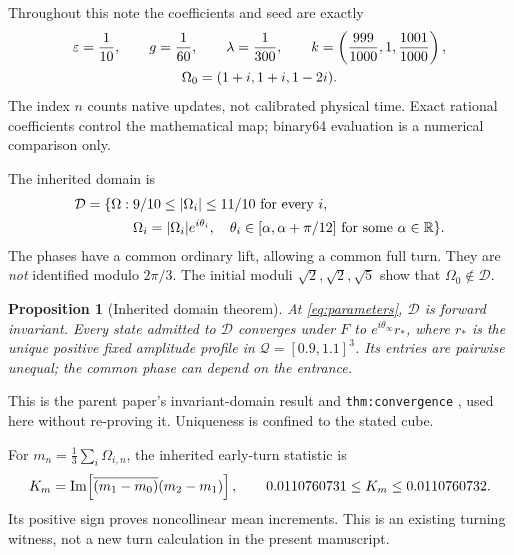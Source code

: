 \documentclass[11pt,a4paper]{article}
\numberwithin{equation}{section}
\newtheorem{proposition}[theorem]{Proposition}
\theoremstyle{remark}\newtheorem{remark}[theorem]{Remark}
\newcommand{\D}{\mathcal D}\newcommand{\Q}{\mathcal Q}
\begin{document}
Throughout this note the coefficients and seed are exactly
\begin{gather}
\varepsilon=\frac1{10},\qquad g=\frac1{60},\qquad\lambda=\frac1{300},\qquad
k=\left(\frac{999}{1000},1,\frac{1001}{1000}\right),\label{eq:parameters}\\
\Omega_0=(1+i,1+i,1-2i).\label{eq:seed}
\end{gather}
The index $n$ counts native updates, not calibrated physical time. Exact rational coefficients control the mathematical map; binary64 evaluation is a numerical comparison only.

The inherited domain is
\begin{equation}
\begin{split}
\D=\{\Omega:\;&9/10\le|\Omega_i|\le11/10\ \text{for every }i,\\
&\Omega_i=|\Omega_i|e^{i\theta_i},\quad
\theta_i\in[\alpha,\alpha+\pi/12]\ \text{for some }\alpha\in\R\}.
\end{split}\label{eq:domain}
\end{equation}
The phases have a common ordinary lift, allowing a common full turn. They are \emph{not} identified modulo $2\pi/3$. The initial moduli $\sqrt2,\sqrt2,\sqrt5$ show that $\Omega_0\notin\D$.

\begin{proposition}[Inherited domain theorem]\label{prop:inherited}
At \eqref{eq:parameters}, $\D$ is forward invariant. Every state admitted to $\D$ converges under $F$ to $e^{i\theta_\infty}r_*$, where $r_*$ is the unique positive fixed amplitude profile in $\Q=[0.9,1.1]^3$. Its entries are pairwise unequal; the common phase can depend on the entrance.
\end{proposition}
This is the parent paper's invariant-domain result and \texttt{thm:convergence} \cite{parent}, used here without re-proving it. Uniqueness is confined to the stated cube.

For $m_n=\tfrac13\sum_i\Omega_{i,n}$, the inherited early-turn statistic is
\begin{equation}
K_m=\operatorname{Im}\!\left[\overline{(m_1-m_0)}(m_2-m_1)\right],\qquad
0.0110760731\le K_m\le0.0110760732.\label{eq:turn}
\end{equation}
Its positive sign proves noncollinear mean increments. This is an existing turning witness, not a new turn calculation in the present manuscript.

\clearpage
\end{document}
